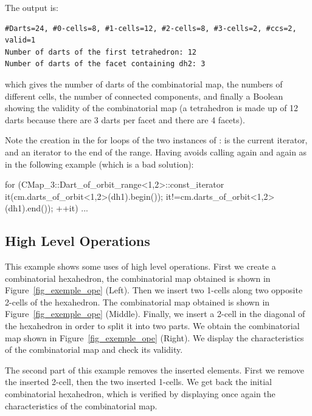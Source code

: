 
The output is:
\begin{verbatim}
#Darts=24, #0-cells=8, #1-cells=12, #2-cells=8, #3-cells=2, #ccs=2, valid=1
Number of darts of the first tetrahedron: 12
Number of darts of the facet containing dh2: 3
\end{verbatim}

which gives the number of darts of the combinatorial map, the numbers
of different cells, the number of connected components, and finally a
Boolean showing the validity of the combinatorial map (a tetrahedron
is made up of 12 darts because there are 3 darts per facet and there
are 4 facets).

Note the creation in the for loops of the two instances of
:  is the current iterator,
and  an iterator to the end of the range. Having
 avoids calling 
again and again as in the following example (which is a bad
solution):
\begin{ccExampleCode}
  for (CMap_3::Dart_of_orbit_range<1,2>::const_iterator 
       it(cm.darts_of_orbit<1,2>(dh1).begin());
       it!=cm.darts_of_orbit<1,2>(dh1).end()); ++it)
  {...}
\end{ccExampleCode}

\subsection{High Level Operations}
\label{ssec-exemple-operations}

This example shows some uses of high level operations.  First we
create a combinatorial hexahedron, the combinatorial map obtained is shown in
Figure~\ref{fig_exemple_ope} (Left). Then we insert two 1-cells along
two opposite 2-cells of the hexahedron. The combinatorial map
obtained is shown in Figure~\ref{fig_exemple_ope} (Middle).  Finally, we
insert a 2-cell in the diagonal of the hexahedron in order to split
it into two parts. We obtain the combinatorial map shown in
Figure~\ref{fig_exemple_ope} (Right). We display the characteristics
of the combinatorial map and check its validity.

The second part of this example removes the inserted elements. First
we remove the inserted 2-cell, then the two inserted 1-cells. We get
back the initial combinatorial hexahedron, which is verified by displaying once
again the characteristics of the combinatorial map.

